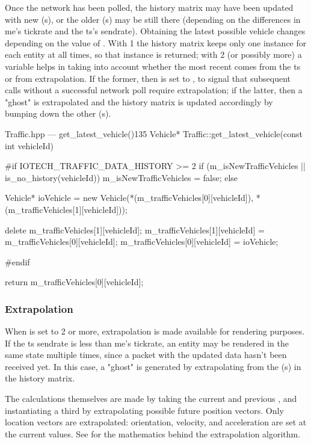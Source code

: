 Once the network has been polled, the history matrix may have been updated with new (s), or the older (s) may be still there (depending on the differences in \gls{me}'s \gls{tickrate} and the \gls{ts}'s \gls{sendrate}). Obtaining the latest possible vehicle changes depending on the value of . With \num{1} the history matrix keeps only one instance for each entity at all times, so that instance is returned; with \num{2} (or possibly more) a variable helps in taking into account whether the most recent  comes from the \gls{ts} or from extrapolation. If the former, then  is set to , to signal that subsequent calls without a successful network poll require extrapolation; if the latter, then a "ghost"  is extrapolated and the history matrix is updated accordingly by bumping down the other (s).

\begin{codelist}{Traffic.hpp --- get\_latest\_vehicle()}{135}
Vehicle* Traffic::get_latest_vehicle(const int vehicleId) {
#if IOTECH_TRAFFIC_DATA_HISTORY >= 2
    if (m_isNewTrafficVehicles || is_no_history(vehicleId)) {
        m_isNewTrafficVehicles = false;
    } else {
        Vehicle* ioVehicle = new Vehicle(*(m_trafficVehicles[0][vehicleId]), *(m_trafficVehicles[1][vehicleId]));

        delete m_trafficVehicles[1][vehicleId];
        m_trafficVehicles[1][vehicleId] = m_trafficVehicles[0][vehicleId];
        m_trafficVehicles[0][vehicleId] = ioVehicle;
    }
#endif

    return m_trafficVehicles[0][vehicleId];
}
\end{codelist}

\subsubsection{Extrapolation}

When  is set to \num{2} or more, extrapolation is made available for rendering purposes. If the \gls{ts} \gls{sendrate} is less than \gls{me}'s \gls{tickrate}, an entity may be rendered in the same state multiple times, since a packet with the updated data hasn't been received yet. In this case, a "ghost"  is generated by extrapolating from the (s) in the history matrix.

The calculations themselves are made by taking the current and previous , and instantiating a third  by extrapolating possible future position vectors. Only location vectors are extrapolated: orientation, velocity, and acceleration are set at the current values. See  for the mathematics behind the extrapolation algorithm.

